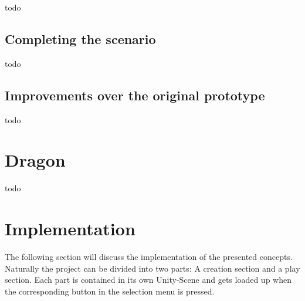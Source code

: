 \documentclass{sigchi-ext}
\begin{document}
todo

\subsection{Completing the scenario}

todo


\subsection{Improvements over the original prototype}

todo

\section{Dragon}

todo

%		
%		

\section{Implementation}

The following section will discuss the implementation of the presented concepts. Naturally the project can be divided into two parts: A creation section and a play section. Each part is contained in its own Unity-Scene \cite{unityscene} and gets loaded up when the corresponding button in the selection menu is pressed.
\end{document}
